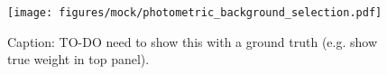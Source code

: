 \documentclass[twocolumn]{aastex631}
\newcommand{\mbf}[1]{\mathbf{#1}}
\newcommand{\mcal}[1]{\mathcal{#1}}
\newcommand{\Exp}[1]{e^{#1}}
\newcommand{\pdf}{\mcal{P}}
\begin{document}






        




        \begin{figure}
            \centering
            \texttt{[image: figures/mock/photometric\_background\_selection.pdf]}
            \caption{Caption: TO-DO need to show this with a ground truth (e.g. show true weight in top panel).}
            \label{fig:mock_data_photometric_background_selection}
        \end{figure}
\end{document}
